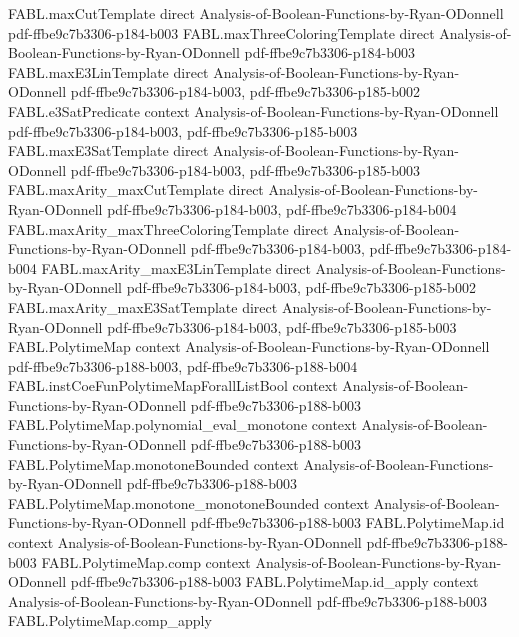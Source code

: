 \begin{theorem}
\proofstep
  {FABL.maxCutTemplate}
  {direct}
  {Analysis-of-Boolean-Functions-by-Ryan-ODonnell}
  {pdf-ffbe9c7b3306-p184-b003}
\proofstep
  {FABL.maxThreeColoringTemplate}
  {direct}
  {Analysis-of-Boolean-Functions-by-Ryan-ODonnell}
  {pdf-ffbe9c7b3306-p184-b003}
\proofstep
  {FABL.maxE3LinTemplate}
  {direct}
  {Analysis-of-Boolean-Functions-by-Ryan-ODonnell}
  {pdf-ffbe9c7b3306-p184-b003,
    pdf-ffbe9c7b3306-p185-b002}
\proofstep
  {FABL.e3SatPredicate}
  {context}
  {Analysis-of-Boolean-Functions-by-Ryan-ODonnell}
  {pdf-ffbe9c7b3306-p184-b003,
    pdf-ffbe9c7b3306-p185-b003}
\proofstep
  {FABL.maxE3SatTemplate}
  {direct}
  {Analysis-of-Boolean-Functions-by-Ryan-ODonnell}
  {pdf-ffbe9c7b3306-p184-b003,
    pdf-ffbe9c7b3306-p185-b003}
\proofstep
  {FABL.maxArity_maxCutTemplate}
  {direct}
  {Analysis-of-Boolean-Functions-by-Ryan-ODonnell}
  {pdf-ffbe9c7b3306-p184-b003,
    pdf-ffbe9c7b3306-p184-b004}
\proofstep
  {FABL.maxArity_maxThreeColoringTemplate}
  {direct}
  {Analysis-of-Boolean-Functions-by-Ryan-ODonnell}
  {pdf-ffbe9c7b3306-p184-b003,
    pdf-ffbe9c7b3306-p184-b004}
\proofstep
  {FABL.maxArity_maxE3LinTemplate}
  {direct}
  {Analysis-of-Boolean-Functions-by-Ryan-ODonnell}
  {pdf-ffbe9c7b3306-p184-b003,
    pdf-ffbe9c7b3306-p185-b002}
\proofstep
  {FABL.maxArity_maxE3SatTemplate}
  {direct}
  {Analysis-of-Boolean-Functions-by-Ryan-ODonnell}
  {pdf-ffbe9c7b3306-p184-b003,
    pdf-ffbe9c7b3306-p185-b003}
\proofstep
  {FABL.PolytimeMap}
  {context}
  {Analysis-of-Boolean-Functions-by-Ryan-ODonnell}
  {pdf-ffbe9c7b3306-p188-b003,
    pdf-ffbe9c7b3306-p188-b004}
\proofstep
  {FABL.instCoeFunPolytimeMapForallListBool}
  {context}
  {Analysis-of-Boolean-Functions-by-Ryan-ODonnell}
  {pdf-ffbe9c7b3306-p188-b003}
\proofstep
  {FABL.PolytimeMap.polynomial_eval_monotone}
  {context}
  {Analysis-of-Boolean-Functions-by-Ryan-ODonnell}
  {pdf-ffbe9c7b3306-p188-b003}
\proofstep
  {FABL.PolytimeMap.monotoneBounded}
  {context}
  {Analysis-of-Boolean-Functions-by-Ryan-ODonnell}
  {pdf-ffbe9c7b3306-p188-b003}
\proofstep
  {FABL.PolytimeMap.monotone_monotoneBounded}
  {context}
  {Analysis-of-Boolean-Functions-by-Ryan-ODonnell}
  {pdf-ffbe9c7b3306-p188-b003}
\proofstep
  {FABL.PolytimeMap.id}
  {context}
  {Analysis-of-Boolean-Functions-by-Ryan-ODonnell}
  {pdf-ffbe9c7b3306-p188-b003}
\proofstep
  {FABL.PolytimeMap.comp}
  {context}
  {Analysis-of-Boolean-Functions-by-Ryan-ODonnell}
  {pdf-ffbe9c7b3306-p188-b003}
\proofstep
  {FABL.PolytimeMap.id_apply}
  {context}
  {Analysis-of-Boolean-Functions-by-Ryan-ODonnell}
  {pdf-ffbe9c7b3306-p188-b003}
\proofstep
  {FABL.PolytimeMap.comp_apply}

\end{theorem}
